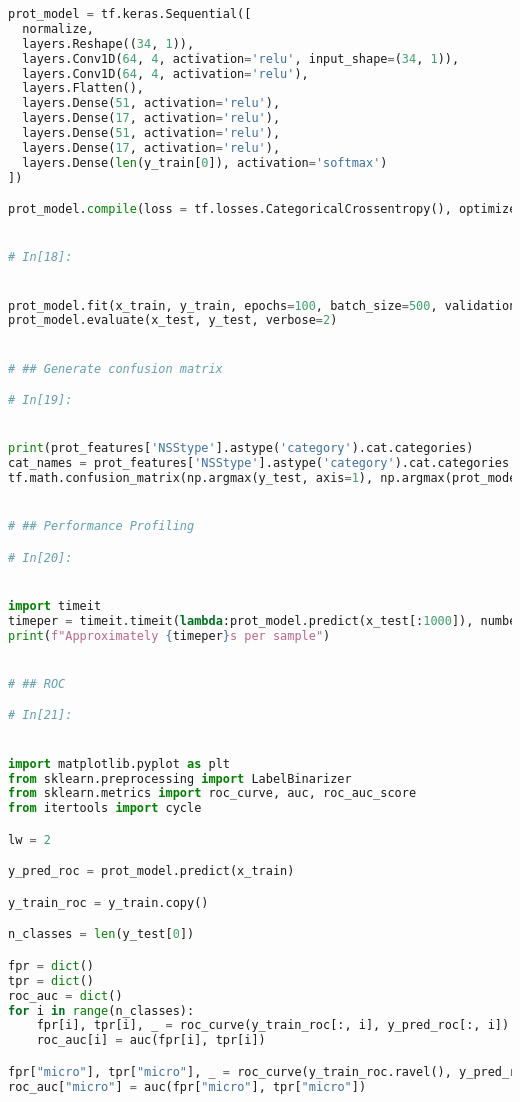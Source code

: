 \documentclass[12pt,letterpaper,oneside,reqno]{book}
\theoremstyle{plain}
\theoremstyle{definition}
\theoremstyle{plain}
\theoremstyle{remark}
\theoremstyle{plain}
\theoremstyle{definition}
\theoremstyle{plain}
\begin{document}
\begin{appendices}
\begin{lstlisting}[language=Python, label=lst:7classdcnnfull, frame=single]
prot_model = tf.keras.Sequential([
  normalize,
  layers.Reshape((34, 1)),
  layers.Conv1D(64, 4, activation='relu', input_shape=(34, 1)),
  layers.Conv1D(64, 4, activation='relu'),
  layers.Flatten(),
  layers.Dense(51, activation='relu'),
  layers.Dense(17, activation='relu'),
  layers.Dense(51, activation='relu'),
  layers.Dense(17, activation='relu'),
  layers.Dense(len(y_train[0]), activation='softmax')
])

prot_model.compile(loss = tf.losses.CategoricalCrossentropy(), optimizer=tf.optimizers.Adam(), metrics=['categorical_accuracy'])


# In[18]:


prot_model.fit(x_train, y_train, epochs=100, batch_size=500, validation_data=(x_val, y_val), callbacks = [tf.keras.callbacks.EarlyStopping(patience = 4)])
prot_model.evaluate(x_test, y_test, verbose=2)


# ## Generate confusion matrix

# In[19]:


print(prot_features['NSStype'].astype('category').cat.categories)
cat_names = prot_features['NSStype'].astype('category').cat.categories
tf.math.confusion_matrix(np.argmax(y_test, axis=1), np.argmax(prot_model.predict(x_test), axis=1))


# ## Performance Profiling

# In[20]:


import timeit
timeper = timeit.timeit(lambda:prot_model.predict(x_test[:1000]), number=50)/50000
print(f"Approximately {timeper}s per sample")


# ## ROC

# In[21]:


import matplotlib.pyplot as plt 
from sklearn.preprocessing import LabelBinarizer
from sklearn.metrics import roc_curve, auc, roc_auc_score
from itertools import cycle

lw = 2

y_pred_roc = prot_model.predict(x_train)

y_train_roc = y_train.copy()

n_classes = len(y_test[0])

fpr = dict()
tpr = dict()
roc_auc = dict()
for i in range(n_classes):
    fpr[i], tpr[i], _ = roc_curve(y_train_roc[:, i], y_pred_roc[:, i])
    roc_auc[i] = auc(fpr[i], tpr[i])

fpr["micro"], tpr["micro"], _ = roc_curve(y_train_roc.ravel(), y_pred_roc.ravel())
roc_auc["micro"] = auc(fpr["micro"], tpr["micro"])


\end{lstlisting}
\end{appendices}
\end{document}
